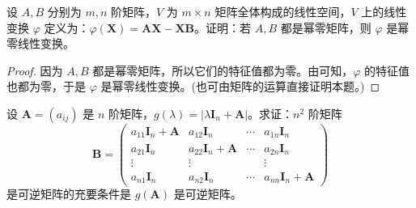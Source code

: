 \documentclass[../../main.tex]{subfiles}
\begin{document}
\begin{example}
设 $A,B$ 分别为 $m,n$ 阶矩阵，$V$ 为 $m \times n$ 矩阵全体构成的线性空间，$V$ 上的线性变换 $\varphi$ 定义为：$\varphi(\boldsymbol{X}) = \boldsymbol{AX} - \boldsymbol{XB}$。证明：若 $A,B$ 都是幂零矩阵，则 $\varphi$ 是幂零线性变换。
\end{example}
\begin{proof}
因为 $A,B$ 都是幂零矩阵，所以它们的特征值都为零。由可知，$\varphi$ 的特征值也都为零，于是 $\varphi$ 是幂零线性变换。(也可由矩阵的运算直接证明本题。)

\end{proof}

\begin{example}
设 $\boldsymbol{A} = (a_{ij})$ 是 $n$ 阶矩阵，$g(\lambda) = |\lambda\boldsymbol{I}_n + \boldsymbol{A}|$。求证：$n^2$ 阶矩阵
\[
\boldsymbol{B} = 
\begin{pmatrix}
a_{11}\boldsymbol{I}_n + \boldsymbol{A} & a_{12}\boldsymbol{I}_n & \cdots & a_{1n}\boldsymbol{I}_n \\
a_{21}\boldsymbol{I}_n & a_{22}\boldsymbol{I}_n + \boldsymbol{A} & \cdots & a_{2n}\boldsymbol{I}_n \\
\vdots & \vdots & & \vdots \\
a_{n1}\boldsymbol{I}_n & a_{n2}\boldsymbol{I}_n & \cdots & a_{nn}\boldsymbol{I}_n + \boldsymbol{A}
\end{pmatrix}
\]
是可逆矩阵的充要条件是 $g(\boldsymbol{A})$ 是可逆矩阵。
\end{example}
\end{document}

